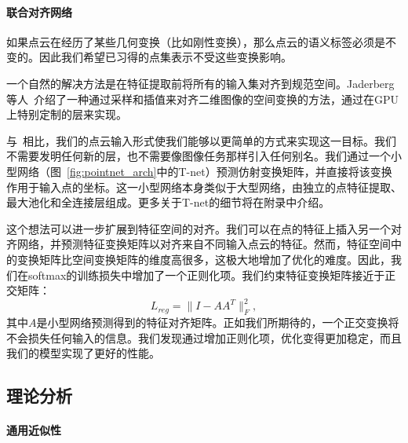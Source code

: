 \paragraph{联合对齐网络}
如果点云在经历了某些几何变换（比如刚性变换），那么点云的语义标签必须是不变的。因此我们希望已习得的点集表示不受这些变换影响。

一个自然的解决方法是在特征提取前将所有的输入集对齐到规范空间。Jaderberg等人~\cite{jaderberg2015spatial}介绍了一种通过采样和插值来对齐二维图像的空间变换的方法，通过在GPU上特别定制的层来实现。

与~\cite{jaderberg2015spatial}相比，我们的点云输入形式使我们能够以更简单的方式来实现这一目标。我们不需要发明任何新的层，也不需要像图像任务那样引入任何别名。我们通过一个小型网络（图~\ref{fig:pointnet_arch}中的T-net）预测仿射变换矩阵，并直接将该变换作用于输入点的坐标。这一小型网络本身类似于大型网络，由独立的点特征提取、最大池化和全连接层组成。更多关于T-net的细节将在附录中介绍。

这个想法可以进一步扩展到特征空间的对齐。我们可以在点的特征上插入另一个对齐网络，并预测特征变换矩阵以对齐来自不同输入点云的特征。然而，特征空间中的变换矩阵比空间变换矩阵的维度高很多，这极大地增加了优化的难度。因此，我们在softmax的训练损失中增加了一个正则化项。我们约束特征变换矩阵接近于正交矩阵：
\begin{equation}
    L_{reg} = \|I - AA^T\|_F^2,
\end{equation}
其中$A$是小型网络预测得到的特征对齐矩阵。正如我们所期待的，一个正交变换将不会损失任何输入的信息。我们发现通过增加正则化项，优化变得更加稳定，而且我们的模型实现了更好的性能。


\subsection{理论分析}
\label{sec:theory}
 

\paragraph{通用近似性} 

